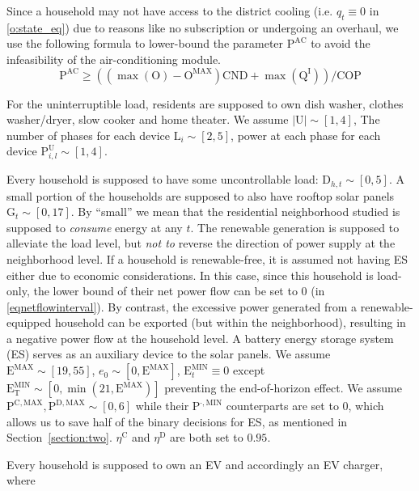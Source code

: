 \documentclass[journal]{IEEEtran}
\begin{document}
Since a household may not have access to the district cooling (i.e. $q_t \equiv 0$ in \eqref{o:state_eq})
due to reasons like no subscription or undergoing an overhaul,
we use the following formula to lower-bound the parameter $\mathrm{P}^\text{AC}$ to avoid
the infeasibility of the air-conditioning module.
\begin{equation}
    \mathrm{P}^\text{AC} \ge ((\max(\mathrm{O}) - \mathrm{O}^\text{MAX})\mathrm{CND} + \max(\mathrm{Q}^\mathrm{I})) / \mathrm{COP}
\end{equation}
\par
For the uninterruptible load, residents are supposed to own dish washer,
clothes washer/dryer, slow cooker and home theater.
We assume $|\mathrm{U}| \sim [1, 4]$,
The number of phases for each device $\mathrm{L}_i \sim [2, 5]$,
power at each phase for each device $\mathrm{P}^\mathrm{U}_{i, l} \sim [1, 4]$.
\par
Every household is supposed to have some uncontrollable load: $\mathrm{D}_{h, t} \sim [0, 5]$.
A small portion of the households are supposed to also have rooftop solar panels $\mathrm{G}_t \sim [0, 17]$.
By ``small'' we mean that the residential neighborhood studied is supposed to \textit{consume} energy at any $t$.
The renewable generation is supposed to alleviate the load level, but \textit{not to} reverse the direction of power
supply at the neighborhood level.
If a household is renewable-free, it is assumed not having ES either due to economic considerations.
In this case, since this household is load-only, the lower bound of their net power flow can be set to $0$ (in \eqref{eqnetflowinterval}).
By contrast, the excessive power generated from a renewable-equipped household can be exported
(but within the neighborhood), resulting in a negative power flow at the household level.
A battery energy storage system (ES) serves as an auxiliary device to the solar panels.
We assume $\mathrm{E}^\mathrm{MAX} \sim [19, 55]$, $e_0 \sim [0, \mathrm{E}^\mathrm{MAX}]$,
$\mathrm{E}^\mathrm{MIN}_t \equiv 0$ except
$\mathrm{E}^\mathrm{MIN}_\mathrm{T} \sim [0, \min(21, \mathrm{E}^\mathrm{MAX})]$ preventing
the end-of-horizon effect.
We assume $\mathrm{P}^{\mathrm{C}, \text{MAX}}, \mathrm{P}^{\mathrm{D}, \text{MAX}} \sim [0, 6]$
while their $\mathrm{P}^{\cdot, \text{MIN}}$ counterparts are set to $0$, which allows us to save half of the binary decisions
for ES, as mentioned in Section~\ref{section:two}.
$\eta^\mathrm{C}$ and $\eta^\mathrm{D}$ are both set to $0.95$.
\par
Every household is supposed to own an EV and accordingly an EV charger, where
\end{document}
